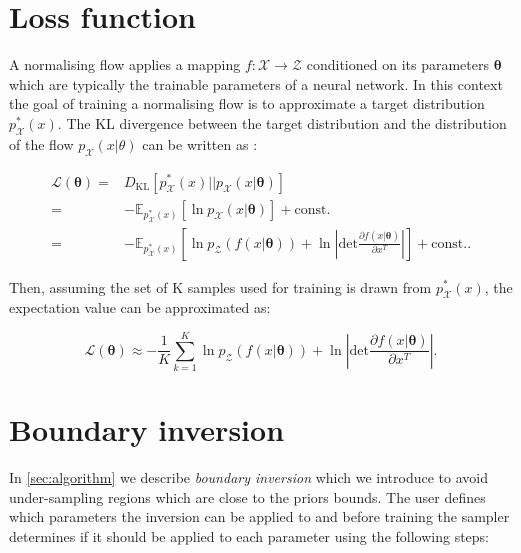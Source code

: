 \documentclass[%
 reprint,
nofootinbib,
 amsmath,amssymb,
 aps,
 prd,
]{revtex4-2}
\newcommand{\latent}{\mathcal{Z}}
\newcommand{\physical}{\mathcal{X}}
\renewcommand{\vec}[1]{\boldsymbol{#1}}
\begin{document}
\begin{widetext}

\appendix

\section{Loss function}\label{app:loss}

A normalising flow applies a mapping $f: \physical \to \latent$ conditioned on its parameters $\vec{\theta}$ which are typically the trainable parameters of a neural network. In this context the goal of training a normalising flow is to approximate a target distribution $p^{*}_{\physical}(x)$. The KL divergence between the target distribution and the distribution of the flow $p_{\physical}(x|\theta)$ can be written as \cite{Paramakarios:2019nfpmi}:

\begin{equation}
    \begin{split}
        \mathcal{L}(\vec{\theta})  = & D_{\textrm{KL}}[p^{*}_{\physical}(x) ||p_{\physical}(x|\vec{\theta}) ] \\
        = & - \mathbb{E}_{p^{*}_{\physical}(x)} [\ln p_{\physical}(x|\vec{\theta})] + \textrm{const.} \\
        = & - \mathbb{E}_{p^{*}_{\physical}(x)} \left[\ln p_{\latent}(f(x|\vec{\theta})) + \ln \left|\textrm{det} \frac{\partial f(x|\vec{\theta})}{\partial x^{T}} \right|\right] + \textrm{const.}.
    \end{split}
\end{equation}

Then, assuming the set of K samples used for training is drawn from $p^{*}_{\physical}(x)$, the expectation value can be approximated as:

\begin{equation}\label{eq:loss}
    \mathcal{L}(\vec{\theta}) \approx - \frac{1}{K} \sum_{k=1}^{K} \ln p_{\latent}(f(x|\vec{\theta})) + \ln \left|\textrm{det} \frac{\partial f(x|\vec{\theta})}{\partial x^{T}} \right|.
\end{equation}

\section{Boundary inversion}\label{app:inversion}

In \cref{sec:algorithm} we describe \textit{boundary inversion} which we introduce to avoid under-sampling regions which are close to the priors bounds. The user defines which parameters the inversion can be applied to and before training the sampler determines if it should be applied to each parameter using the following steps:


\end{widetext}
\end{document}
